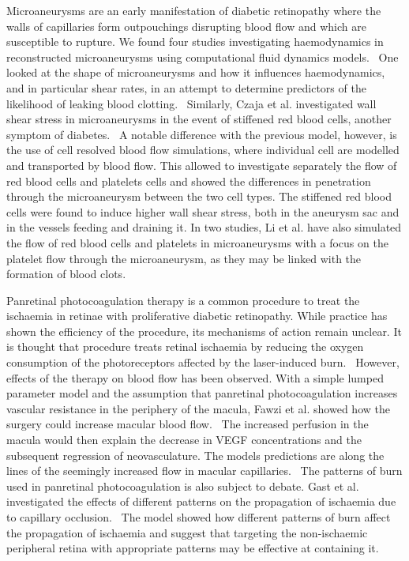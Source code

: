 \documentclass{article}
\begin{document}
Microaneurysms are an early manifestation of diabetic retinopathy where the walls of capillaries form outpouchings disrupting blood flow and which are susceptible to rupture.
We found four studies investigating haemodynamics in reconstructed microaneurysms using computational fluid dynamics models.~\cite{Bernabeu_2018,Czaja_2022,Li_2020,Li_2022}
One looked at the shape of microaneurysms and how it influences haemodynamics, and in particular shear rates, in an attempt to determine predictors of the likelihood of leaking blood clotting.~\cite{Bernabeu_2018}
Similarly, Czaja et al. investigated wall shear stress in microaneurysms in the event of stiffened red blood cells, another symptom of diabetes.~\cite{Czaja_2022}
A notable difference with the previous model, however, is the use of cell resolved blood flow simulations, where individual cell are modelled and transported by blood flow.
This allowed to investigate separately the flow of red blood cells and platelets cells and showed the differences in penetration through the microaneurysm between the two cell types.
The stiffened red blood cells were found to induce higher wall shear stress, both in the aneurysm sac and in the vessels feeding and draining it.
In two studies, Li et al. have also simulated the flow of red blood cells and platelets in microaneurysms with a focus on the platelet flow through the microaneurysm, as they may be linked with the formation of blood clots.~\cite{Li_2020,Li_2022}


Panretinal photocoagulation therapy is a common procedure to treat the ischaemia in retinae with proliferative diabetic retinopathy.
While practice has shown the efficiency of the procedure, its mechanisms of action remain unclear.
It is thought that procedure treats retinal ischaemia by reducing the oxygen consumption of the photoreceptors affected by the laser-induced burn.~\cite{Fawzi_2019,Gast_2016}
However, effects of the therapy on blood flow has been observed.
With a simple lumped parameter model and the assumption that panretinal photocoagulation increases vascular resistance in the periphery of the macula, Fawzi et al. showed how the surgery could increase macular blood flow.~\cite{Fawzi_2019}
The increased perfusion in the macula would then explain the decrease in VEGF concentrations and the subsequent regression of neovasculature.
The models predictions are along the lines of the seemingly increased flow in macular capillaries.~\cite{Fawzi_2019} 
The patterns of burn used in panretinal photocoagulation is also subject to debate.
Gast et al. investigated the effects of different patterns on the propagation of ischaemia due to capillary occlusion.~\cite{Gast_2016}
The model showed how different patterns of burn affect the propagation of ischaemia and suggest that targeting the non-ischaemic peripheral retina with appropriate patterns may be effective at containing it.
\end{document}
